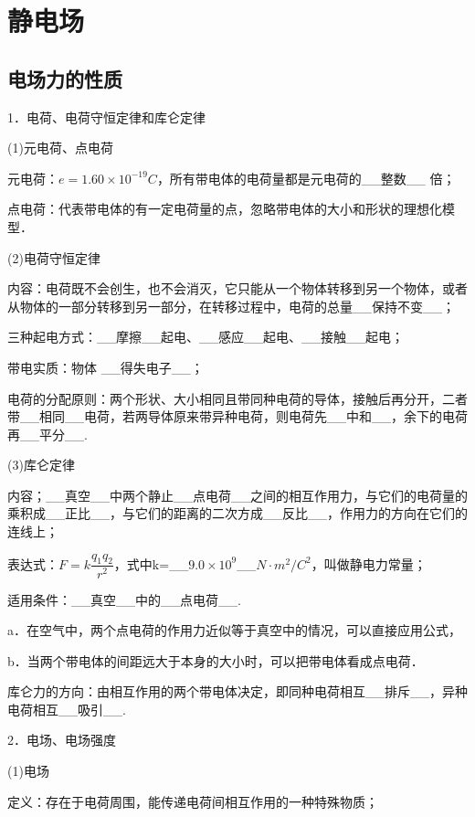 \chapter{静电场}
\section{电场力的性质}





1．电荷、电荷守恒定律和库仑定律

(1)元电荷、点电荷

元电荷：$e=1.60\times10^{-19}C$，所有带电体的电荷量都是元电荷的\_\_整数\_\_
倍；

点电荷：代表带电体的有一定电荷量的点，忽略带电体的大小和形状的理想化模型．

(2)电荷守恒定律

内容：电荷既不会创生，也不会消灭，它只能从一个物体转移到另一个物体，或者从物体的一部分转移到另一部分，在转移过程中，电荷的总量\_\_保持不变\_\_；

三种起电方式：\_\_摩擦\_\_起电、\_\_感应\_\_起电、\_\_接触\_\_起电；

带电实质：物体 \_\_得失电子\_\_；

电荷的分配原则：两个形状、大小相同且带同种电荷的导体，接触后再分开，二者带\_\_相同\_\_电荷，若两导体原来带异种电荷，则电荷先\_\_中和\_\_，余下的电荷再\_\_平分\_\_.

(3)库仑定律

内容；\_\_真空\_\_中两个静止\_\_点电荷\_\_之间的相互作用力，与它们的电荷量的乘积成\_\_正比\_\_，与它们的距离的二次方成\_\_反比\_\_，作用力的方向在它们的连线上；

表达式：$F=k\dfrac{q_1q_2}{r^2}$，式中k=\_\_$9.0\times 10^9$\_\_$N\cdot m^2/C^2$，叫做静电力常量；

适用条件：\_\_真空\_\_中的\_\_点电荷\_\_.

a．在空气中，两个点电荷的作用力近似等于真空中的情况，可以直接应用公式，

b．当两个带电体的间距远大于本身的大小时，可以把带电体看成点电荷．

库仑力的方向：由相互作用的两个带电体决定，即同种电荷相互\_\_排斥\_\_，异种电荷相互\_\_吸引\_\_.

2．电场、电场强度

(1)电场

定义：存在于电荷周围，能传递电荷间相互作用的一种特殊物质；

